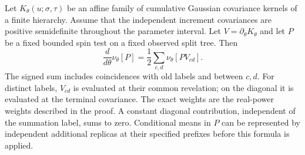 \begin{proposition}\label{prop:found-replica}
Let $K_\theta(u;\sigma,\tau)$ be an affine family of cumulative Gaussian
covariance kernels of a finite hierarchy. Assume that the independent
increment covariances are positive semidefinite throughout the parameter
interval. Let $V=\partial_\theta K_\theta$ and let $P$ be a fixed bounded
spin test on a fixed observed split tree. Then
\begin{equation}
 \frac{d}{d\theta}\nu_\theta[P]
      =\frac12\sum_{c,d}\nu_\theta[P V_{cd}].
 \tag{2}\label{eq:2}
\end{equation}
The signed sum includes coincidences with old labels and between $c,d$.
For distinct labels, $V_{cd}$ is evaluated at their common revelation;
on the diagonal it is evaluated at the terminal covariance. The exact
weights are the real-power weights described in the proof. A constant
diagonal contribution, independent of the summation label, sums to zero.
Conditional means in $P$ can be represented by independent additional
replicas at their specified prefixes before this formula is applied.
\end{proposition}

